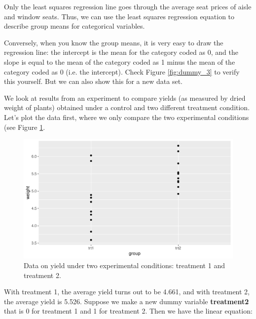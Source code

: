 \documentclass[]{report}\usepackage[]{graphicx}\usepackage[]{color}
\makeatletter
\def\maxwidth{ %
  \ifdim\Gin@nat@width>\linewidth
    \linewidth
  \else
    \Gin@nat@width
  \fi
}
\newenvironment{knitrout}{}{} %
\makeatother
\begin{document}
Only the least squares regression line goes through the average seat prices of aisle and window seats. Thus, we can use the least squares regression equation to describe group means for categorical variables. 

Conversely, when you know the group means, it is very easy to draw the regression line: the intercept is the mean for the category coded as 0, and the slope is equal to the mean of the category coded as 1 minus the mean of the category coded as 0 (i.e. the intercept). Check Figure \ref{fig:dummy_3} to verify this yourself. But we can also show this for a new data set.


We look at results from an experiment to compare yields (as measured by dried weight of plants) obtained under a control and two different treatment condition. Let's plot the data first, where we only compare the two experimental conditions (see Figure \ref{fig:dummy_8}.

\begin{knitrout}
\color{fgcolor}\begin{figure}

{\centering \includegraphics[width=\maxwidth]{figure/dummy_8-1} 

}

\caption[Data on yield under two experimental conditions]{Data on yield under two experimental conditions: treatment 1 and treatment 2.}\label{fig:dummy_8}
\end{figure}


\end{knitrout}

With treatment 1, the average yield turns out to be 4.661, and with treatment 2, the average yield is 5.526. Suppose we make a new dummy variable \textbf{treatment2} that is 0 for treatment 1 and 1 for treatment 2. Then we have the linear equation:
\end{document}

